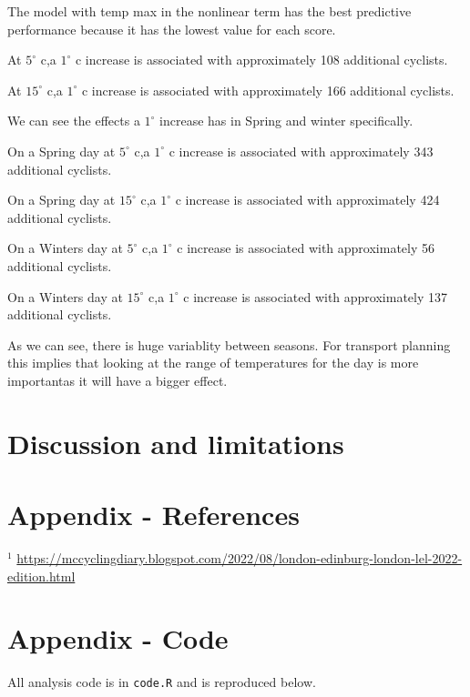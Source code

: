 \documentclass[
]{article}
\begin{document}
The model with temp max in the nonlinear term has the best predictive
performance because it has the lowest value for each score.

At \(5 ^\circ\) c,a \(1 ^\circ\) c increase is associated with
approximately 108 additional cyclists.

At \(15 ^\circ\) c,a \(1 ^\circ\) c increase is associated with
approximately 166 additional cyclists.

We can see the effects a \(1 ^\circ\) increase has in Spring and winter
specifically.

On a Spring day at \(5 ^\circ\) c,a \(1 ^\circ\) c increase is
associated with approximately 343 additional cyclists.

On a Spring day at \(15 ^\circ\) c,a \(1 ^\circ\) c increase is
associated with approximately 424 additional cyclists.

On a Winters day at \(5 ^\circ\) c,a \(1 ^\circ\) c increase is
associated with approximately 56 additional cyclists.

On a Winters day at \(15 ^\circ\) c,a \(1 ^\circ\) c increase is
associated with approximately 137 additional cyclists.

As we can see, there is huge variablity between seasons. For transport
planning this implies that looking at the range of temperatures for the
day is more importantas it will have a bigger effect.

\section{Discussion and limitations}\label{discussion-and-limitations}

\section{Appendix - References}\label{appendix---references}

\(^{1}\)
\url{https://mccyclingdiary.blogspot.com/2022/08/london-edinburg-london-lel-2022-edition.html}

\section{Appendix - Code}\label{appendix---code}

All analysis code is in \texttt{code.R} and is reproduced below.
\end{document}
